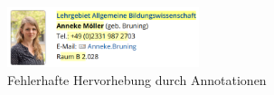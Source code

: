     \begin{figure}[htb]
        \centering
        \includegraphics[width=0.5\textwidth]{../resources/findings/case-study-1/babw/annotations/missing-annotation.png}
        \caption{Fehlerhafte Hervorhebung durch Annotationen}
        \label{image:findingTeachersBaBwWrongAnnotations}
    \end{figure}
